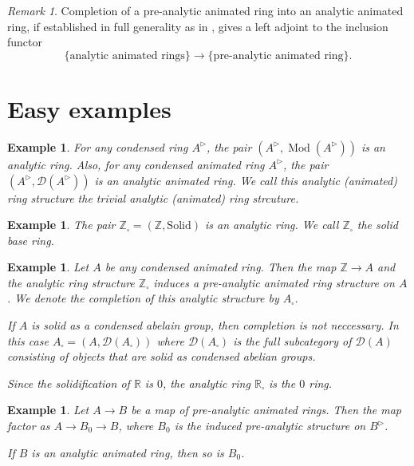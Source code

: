 \documentclass{article}
\theoremstyle{plain}
\newtheorem{exmp}[thm]{Example}
\theoremstyle{definition}
\theoremstyle{remark}
\newtheorem{rmk}[thm]{Remark}
\DeclareMathOperator{\modcat}{Mod}
\newcommand{\huflag}{\triangleright}
\newcommand{\D}{\mathcal{D}}
\newcommand{\solid}{\square}
\begin{document}
\begin{rmk}
Completion of a pre-analytic animated ring into an analytic animated ring,
if established in full generality as in \cite{rodriguez-camargo_notes_nodate},
gives a left adjoint to the inclusion functor
\begin{equation*}
\{\text{analytic animated rings}\}\to \{\text{pre-analytic animated ring}\}.
\end{equation*}
\end{rmk}

\section{Easy examples}

\begin{exmp}
For any condensed ring $ A ^{\huflag} $, the pair $ (A ^{\huflag}, \modcat (A ^{\huflag})) $ is an analytic ring.
Also, for any condensed animated ring $ A ^{\huflag} $, the pair $ (A ^{\huflag}, \D (A ^{\huflag})) $ is an analytic animated ring.
We call this analytic (animated) ring structure the \emph{trivial} analytic (animated) ring strcuture.
\end{exmp}

\begin{exmp}
The pair $ \mathbb{Z}_{\solid} = (\mathbb{Z}, \mathrm{Solid}) $ is an analytic ring.
We call $ \mathbb{Z}_{\solid} $ the solid base ring.
\end{exmp}

\begin{exmp}
Let $ A $ be any condensed animated ring. Then the map $ \mathbb{Z}\to A $ and the analytic ring structure
$ \mathbb{Z}_{\solid} $ induces a pre-analytic animated ring structure on $ A $.
We denote the completion of this analytic structure by $ A _{\solid} $.

If $ A $ is solid as a condensed abelain group, then completion is not neccessary.
In this case $ A _{\solid} = (A, \D (A _{\solid})) $ where $ \D (A _{\solid}) $ is the full subcategory
of $ \D (A) $ consisting of objects that are solid as condensed abelian groups.

Since the solidification of $ \mathbb{R} $ is $ 0 $, the analytic ring $ \mathbb{R}_{\solid} $ is the $ 0 $ ring.
\end{exmp}

\begin{exmp}
Let $ A\to B $ be a map of pre-analytic animated rings.
Then the map factor as $ A \to B _{0}\to B $, where $ B _{0}$ is the induced pre-analytic
structure on $ B ^{\huflag} $.

If $ B $ is an analytic animated ring, then so is $ B _{0} $.
\end{exmp}
\end{document}

